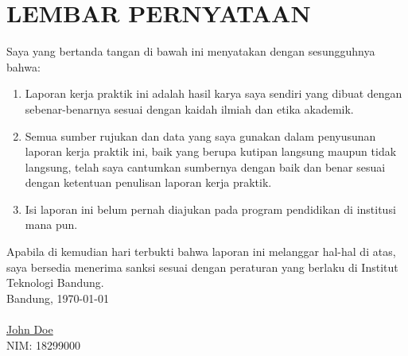 \chapter*{LEMBAR PERNYATAAN}
\vspace{2cm}
Saya yang bertanda tangan di bawah ini menyatakan dengan sesungguhnya bahwa:
\begin{enumerate}
    \item Laporan kerja praktik ini adalah hasil karya saya sendiri yang dibuat dengan sebenar-benarnya sesuai dengan kaidah ilmiah dan etika akademik.
    \item Semua sumber rujukan dan data yang saya gunakan dalam penyusunan laporan kerja praktik ini, baik yang berupa kutipan langsung maupun tidak langsung, telah saya cantumkan sumbernya dengan baik dan benar sesuai dengan ketentuan penulisan laporan kerja praktik.
    \item Isi laporan ini belum pernah diajukan pada program pendidikan di institusi mana pun.
\end{enumerate}
Apabila di kemudian hari terbukti bahwa laporan ini melanggar hal-hal di atas, saya bersedia menerima sanksi sesuai dengan peraturan yang berlaku di Institut Teknologi Bandung.
\\[2cm]
Bandung, \today\\
\\[2cm]

\underline{John Doe} \\
NIM: 18299000
  